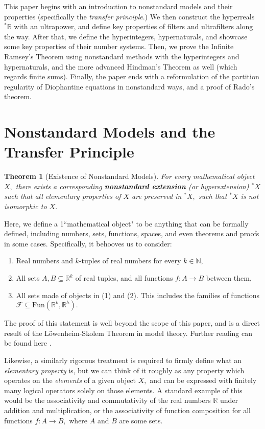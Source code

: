 \documentclass[12pt]{amsart}
\newcommand{\stt}{{}^*}
\newcommand{\NN}{\mathbb{N}}
\newcommand{\RR}{\mathbb{R}}
\theoremstyle{plain}
\newtheorem{thm}{Theorem}
\theoremstyle{definition}
\theoremstyle{remark}
\theoremstyle{theorem}
\numberwithin{equation}{section}
\numberwithin{thm}{section}
\begin{document}
This paper begins with an introduction to nonstandard models and their properties (specifically the \textit{transfer principle}.) We then construct the hyperreals $\stt \RR$ with an ultrapower, and define key properties of filters and ultrafilters along the way. After that, we define the hyperintegers, hypernaturals, and showcase some key properties of their number systems. Then, we prove the Infinite Ramsey's Theorem using nonstandard methods with the hyperintegers and hypernaturals, and the more advanced Hindman's Theorem as well (which regards finite sums). Finally, the paper ends with a reformulation of the partition regularity of Diophantine equations in nonstandard ways, and a proof of Rado's theorem.

\section{Nonstandard Models and the Transfer Principle}
\begin{thm}[Existence of Nonstandard Models]
\label{nonstandardmodels} For every mathematical object $X,$ there exists a corresponding \textbf{nonstandard extension} (or hyperextension) $^*X$ such that all elementary properties of $X$ are preserved in $^*X,$ such that $^*X$ is not isomorphic to $X.$
\end{thm}
Here, we define a 1``mathematical object" to be anything that can be formally defined, including numbers, sets, functions, spaces, and even theorems and proofs in some cases. Specifically, it behooves us to consider:
\begin{enumerate}
    \item Real numbers and $k$-tuples of real numbers for every $k \in \NN,$
    \item All sets $A, B \subseteq \RR^k$ of real tuples, and all functions $f: A \rightarrow B$ between them,
    \item All sets made of objects in (1) and (2). This includes the families of functions $\mathscr{F} \subseteq \text{Fun}(\RR^k, \RR^h).$
\end{enumerate}The proof of this statement is well beyond the scope of this paper, and is a direct result of the L\"{o}wenheim-Skolem Theorem in model theory. Further reading can be found here \cite[Chapter 4]{Go98}.

Likewise, a similarly rigorous treatment is required to firmly define what an \textit{elementary property} is, but we can think of it roughly as any property which operates on the \textit{elements} of a given object $X,$ and can be expressed with finitely many logical operators solely on those elements. A standard example of this would be the associativity and commutativity of the real numbers $\RR$ under addition and multiplication, or the associativity of function composition for all functions $f: A \rightarrow B,$ where $A$ and $B$ are some sets. 
\end{document}

